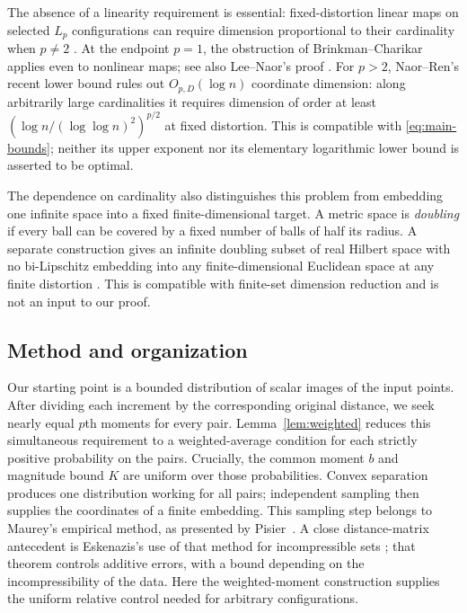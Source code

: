 \documentclass[11pt]{article}
\theoremstyle{remark}
\numberwithin{equation}{section}
\begin{document}
The absence of a linearity requirement is essential: fixed-distortion
linear maps on selected $L_p$ configurations can require dimension
proportional to their cardinality when $p\ne2$
\cite[Section~3]{LeeMendelNaor2005}.
At the endpoint $p=1$, the obstruction of Brinkman--Charikar applies
even to nonlinear maps; see also Lee--Naor's proof
\cite{BrinkmanCharikar2005,LeeNaor2004}.
For $p>2$, Naor--Ren's recent lower bound
\cite[Section~1.1, equation~(2)]{NaorRen2026Threshold} rules out
$O_{p,D}(\log n)$ coordinate dimension: along arbitrarily large
cardinalities it requires dimension of order at least
$(\log n/(\log\log n)^2)^{p/2}$ at fixed distortion.
This is compatible with \eqref{eq:main-bounds}; neither its upper
exponent nor its elementary logarithmic lower bound is asserted to be
optimal.

The dependence on cardinality also distinguishes this problem from embedding
one infinite space into a fixed finite-dimensional target. A metric space is
\emph{doubling} if every ball can be covered by a fixed number of balls of
half its radius. A separate construction gives an infinite doubling subset
of real Hilbert space with no bi-Lipschitz embedding into any
finite-dimensional Euclidean space at any finite distortion
\cite{OpenAI2026DoublingHilbert}. This is compatible with finite-set
dimension reduction and is not an input to our proof.

\subsection{Method and organization}

Our starting point is a bounded distribution of scalar images of the
input points. After dividing each increment by the corresponding
original distance, we seek nearly equal $p$th moments for every pair.
Lemma~\ref{lem:weighted} reduces this simultaneous requirement to a
weighted-average condition for each strictly positive probability on
the pairs. Crucially, the common moment $b$ and magnitude bound $K$
are uniform over those probabilities. Convex separation produces one
distribution working for all pairs; independent sampling then supplies
the coordinates of a finite embedding.
This sampling step belongs to Maurey's empirical method, as presented
by Pisier~\cite{Pisier1981}. A close distance-matrix antecedent
is Eskenazis's use of that method for incompressible sets
\cite[Sections~1.3 and~2.1]{Eskenazis2024}; that theorem controls
additive errors, with a bound depending on the incompressibility of
the data. Here the weighted-moment construction supplies the uniform
relative control needed for arbitrary configurations.
\end{document}
